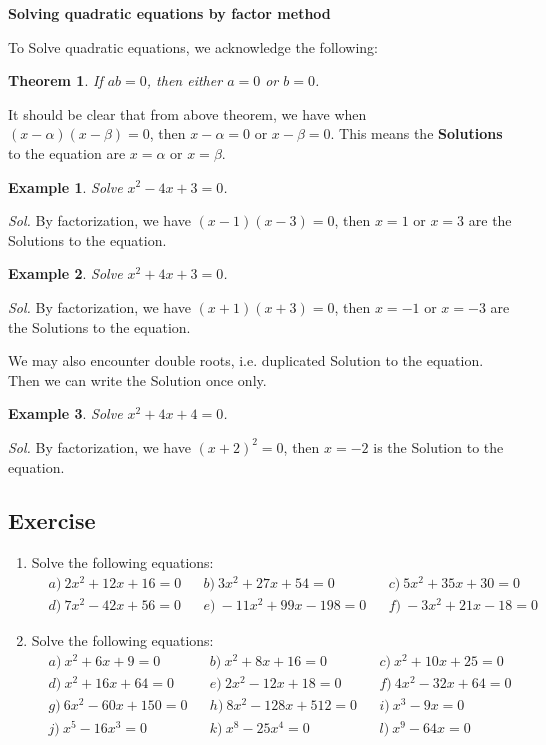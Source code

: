 \documentclass[12pt]{article}
\newtheorem*{theorem}{Theorem}
\newtheorem{example}{Example}
\begin{document}
    \begin{center}
        \textbf{Solving quadratic equations by factor method}
    \end{center}

    To Solve quadratic equations, we acknowledge the following:\begin{theorem}
        If $ab=0$, then either $a=0$ or $b=0$.
    \end{theorem}

    It should be clear that from above theorem, we have when $(x-\alpha)(x-\beta)=0$, then $x-\alpha=0$ or $x-\beta=0$. This means the \textbf{Solutions} to the equation are $x=\alpha$ or $x=\beta$.

    \begin{example}
        Solve $x^2-4x+3=0$.
    \end{example}

    \textit{ Sol. }By factorization, we have $(x-1)(x-3)=0$, then $x=1$ or $x=3$ are the Solutions to the equation.

    \begin{example}
        Solve $x^2+4x+3=0$.
    \end{example}

    \textit{ Sol. }By factorization, we have $(x+1)(x+3)=0$, then $x=-1$ or $x=-3$ are the Solutions to the equation.

    We may also encounter double roots, i.e. duplicated Solution to the equation. Then we can write the Solution once only.

    \begin{example}
        Solve $x^2+4x+4=0$.
    \end{example}

    \textit{ Sol. }By factorization, we have $(x+2)^2=0$, then $x=-2$ is the Solution to the equation.

    \subsection*{Exercise}
    \begin{enumerate}
        \item Solve the following equations:\begin{align*}
            &a)\ 2x^2+12x+16=0&&b)\ 3x^2+27x+54=0&&c)\ 5x^2+35x+30=0\\
            &d)\ 7x^2-42x+56=0&&e)\ -11x^2+99x-198=0&&f)\ -3x^2+21x-18=0
        \end{align*}
        \item Solve the following equations:\begin{align*}
            &a)\ x^2+6x+9=0&&b)\ x^2+8x+16=0&&c)\ x^2+10x+25=0\\
            &d)\ x^2+16x+64=0&&e)\ 2x^2-12x+18=0&&f)\ 4x^2-32x+64=0\\
            &g)\ 6x^2-60x+150=0&&h)\ 8x^2-128x+512=0&&i)\ x^3-9x=0\\
            &j)\ x^5-16x^3=0&&k)\ x^8-25x^4=0&&l)\ x^9-64x=0
        \end{align*}
    \end{enumerate}
\end{document}
